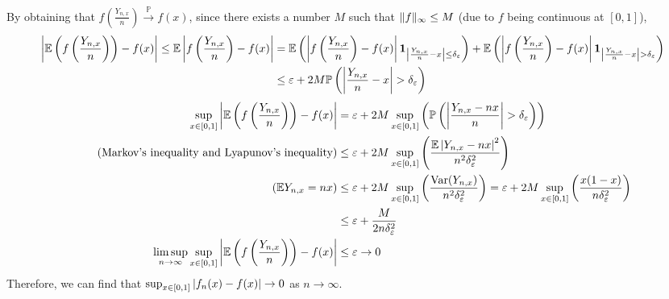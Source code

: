 \documentclass{huhtakm-template-book}
\newcommand{\prob}{\mathbb{P}}
\newcommand{\expect}{\mathbb{E}}
\DeclareMathOperator{\Var}{Var}
\begin{document}
\begin{eg}
	By obtaining that $f\left(\frac{Y_{n,x}}{n}\right)\xrightarrow{\prob}f(x)$, since there exists a number $M$ such that $\lVert{f}\rVert_{\infty}\leq M$ (due to $f$ being continuous at $[0,1]$),
	\begin{align*}
		\abs{\expect\left(f\left(\frac{Y_{n,x}}{n}\right)\right)-f(x)}\leq\expect\abs{f\left(\frac{Y_{n,x}}{n}\right)-f(x)}&=\expect\left(\abs{f\left(\frac{Y_{n,x}}{n}\right)-f(x)}\mathbf{1}_{\abs{\frac{Y_{n,x}}{n}-x}\leq\delta_{\varepsilon}}\right)+\expect\left(\abs{f\left(\frac{Y_{n,x}}{n}\right)-f(x)}\mathbf{1}_{\abs{\frac{Y_{n,x}}{n}-x}>\delta_{\varepsilon}}\right)\\
		&\leq\varepsilon+2M\prob\left(\abs{\frac{Y_{n,x}}{n}-x}>\delta_{\varepsilon}\right)
	\end{align*}
	\begin{align*}
		\sup_{x\in[0,1]}\abs{\expect\left(f\left(\frac{Y_{n,x}}{n}\right)\right)-f(x)}&=\varepsilon+2M\sup_{x\in [0,1]}\left(\prob\left(\abs{\frac{Y_{n,x}-nx}{n}}>\delta_{\varepsilon}\right)\right)\\
		\tag{Markov's inequality and Lyapunov's inequality}
		&\leq\varepsilon+2M\sup_{x\in[0,1]}\left(\frac{\expect\abs{Y_{n,x}-nx}^{2}}{n^{2}\delta_{\varepsilon}^{2}}\right)\\
		\tag{$\expect Y_{n,x}=nx$}
		&\leq\varepsilon+2M\sup_{x\in[0,1]}\left(\frac{\Var(Y_{n,x})}{n^{2}\delta_{\varepsilon}^{2}}\right)=\varepsilon+2M\sup_{x\in[0,1]}\left(\frac{x(1-x)}{n\delta_{\varepsilon}^{2}}\right)\\
		&\leq\varepsilon+\frac{M}{2n\delta_{\varepsilon}^{2}}\\
		\limsup_{n\to\infty}\sup_{x\in[0,1]}\abs{\expect\left(f\left(\frac{Y_{n,x}}{n}\right)\right)-f(x)}&\leq\varepsilon\to 0
	\end{align*}
	Therefore, we can find that $\sup_{x\in[0,1]}\left|{f_{n}(x)-f(x)}\right|\to 0$ as $n\to\infty$.
\end{eg}
\end{document}
